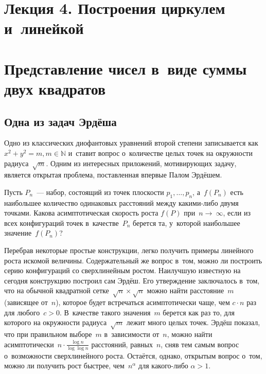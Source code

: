 \documentclass{article}
\begin{document}
\section*{Лекция 4. Построения циркулем и~линейкой}
\resetcntrs

\section{Представление чисел в~виде суммы двух квадратов}

\subsection{Одна из задач Эрдёша}

Одно из классических диофантовых уравнений второй степени записывается как~$x^2
+ y^2 = m, m \in \mathbb{N}$ и~ставит вопрос о~количестве целых точек на
окружности радиуса~$\sqrt{m}$. Одним из интересных приложений, мотивирующих
задачу, является открытая проблема, поставленная впервые Палом Эрдёшем.

\begin{problem}
  Пусть $P_n$~--- набор, состоящий из точек плоскости $p_1, \ldots, p_n$,
  а~$f(P_n)$ есть наибольшее количество одинаковых расстояний между какими-либо
  двумя точками. Какова асимптотическая скорость роста $f(P)$ при~$n
  \rightarrow~\infty$, если из всех конфигураций точек в~качестве~$P_n$ берется
  та, у~которой наибольшее значение~$f(P_n)$?
\end{problem}

Перебрав некоторые простые конструкции, легко получить примеры линейного роста
искомой величины. Содержательный же вопрос в~том, можно ли построить серию
конфигураций со сверхлинейным ростом. Наилучшую известную на сегодня конструкцию
построил сам Эрдёш. Его утверждение заключалось в~том, что на обычной квадратной
сетке~$\sqrt{n} \times \sqrt{n}$ можно найти расстояние~$m$ (зависящее от~$n$),
которое будет встречаться асимптотически чаще, чем $c \cdot n$ раз для
любого~$c > 0$. В~качестве такого значения~$m$ берется как раз то, для которого
на окружности радиуса~$\sqrt{m}$ лежит много целых точек. Эрдёш показал, что при
правильном выборе~$m$ в~зависимости от~$n$, можно найти асимптотически~$n \cdot
\frac{\log n}{\log \log n}$ расстояний, равных~$n$, сняв тем самым вопрос
о~возможности сверхлинейного роста. Остаётся, однако, открытым вопрос о~том,
можно ли получить рост быстрее, чем~$n^\alpha$ для какого-либо $\alpha > 1$.
\end{document}
